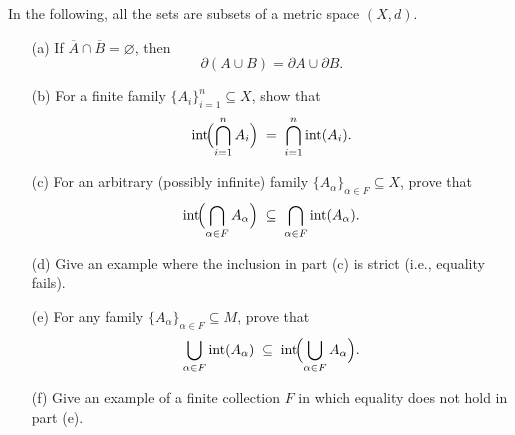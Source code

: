 \begin{problem}
    In the following, all the sets are subsets of a metric space $(X,d)$.

 \begin{enumerate}
  \item[(a)] If $\overline{A}\cap\overline{B}=\varnothing$, then 
  \[
  \partial(A\cup B) = \partial A \cup \partial B.
  \]

  \item[(b)] For a finite family $\{A_i\}_{i=1}^n\subseteq X$, show that
  \[
  \operatorname{int}\!\Bigl(\bigcap_{i=1}^n A_i\Bigr)
  \;=\;
  \bigcap_{i=1}^n \operatorname{int}(A_i).
  \]

  \item[(c)] For an arbitrary (possibly infinite) family $\{A_\alpha\}_{\alpha\in F}\subseteq X$, prove that
  \[
  \operatorname{int}\!\Bigl(\bigcap_{\alpha\in F} A_\alpha\Bigr)
  \;\subseteq\;
  \bigcap_{\alpha\in F}\operatorname{int}(A_\alpha).
  \]

  \item[(d)] Give an example where the inclusion in part \textup{(c)} is strict (i.e., equality fails).

  \item[(e)] For any family $\{A_\alpha\}_{\alpha\in F}\subseteq M$, prove that
  \[
  \bigcup_{\alpha\in F}\operatorname{int}(A_\alpha)
  \;\subseteq\;
  \operatorname{int}\!\Bigl(\bigcup_{\alpha\in F} A_\alpha\Bigr).
  \]

  \item[(f)] Give an example of a finite collection $F$ in which equality does not hold in part \textup{(e)}.
\end{enumerate}

\end{problem}

